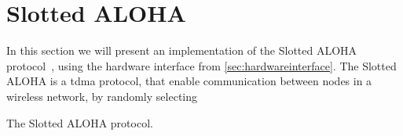 \section{Slotted ALOHA}\label{sec:saloha}
In this section we will present an implementation of the Slotted ALOHA protocol~\cite{Roberts:1975:APS:1024916.1024920}, using the hardware interface from \autoref{sec:hardwareinterface}. The Slotted ALOHA is a \gls{tdma} protocol, that enable communication between nodes in a wireless network, by randomly selecting 

\begin{algorithm}[ht]
    \DontPrintSemicolon
    
    
    \caption{The Slotted ALOHA protocol.}
    \label{algo:slottedaloha}
\end{algorithm}